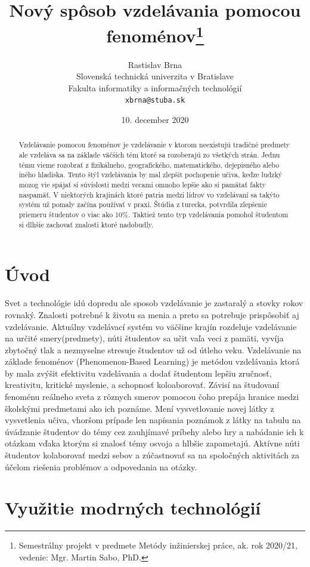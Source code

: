 \documentclass[11pt,slovak,a4paper]{article}
\title{Nový spôsob vzdelávania pomocou fenoménov\thanks{Semestrálny projekt v predmete Metódy inžinierskej práce, ak. rok 2020/21, vedenie: Mgr. Martin Sabo, PhD.}} %
\author{Rastislav Brna\\[2pt]
	{\small Slovenská technická univerzita v Bratislave}\\
	{\small Fakulta informatiky a informačných technológií}\\
	{\small \texttt{xbrna@stuba.sk}}
	}
\date{\small 10. december 2020}
\begin{document}
\maketitle

\begin{abstract}
	Vzdelávanie pomocou fenoménov je vzdelávanie v ktorom neexistujú 
	tradičné predmety ale vzdeláva sa na základe väčších tém ktoré sa rozoberajú zo všetkých strán.
	Jednu tému vieme rozobrať z fizikálneho, geografického, matematického, dejepisného alebo iného 
	hladiska. Tento štýl vzdelávania by mal zlepšit pochopenie učiva, keďze ludzký mozog vie spájať 
	si súvislosti medzi vecami omnoho lepšie ako si pamätať fakty naspamäť. V niektorých krajinách ktoré
	patria medzi lídrov vo vzdelávaní sa takýto systém už pomaly začína používať v praxi. Štúdia z turecka,
	potvrdila zlepšenie priemeru študentov o viac ako 10\%. Taktiež tento typ vzdelávania pomohol študentom 
	si dlhšie zachovať znalosťi ktoré nadobudly.\cite{jcer} 
\end{abstract}

\section{Úvod}

Svet a technológie idú dopredu ale sposob vzdelávanie je zastaralý a stovky rokov rovnaký. Znalosti potrebné k
životu sa menia a preto sa potrebuje prispôsobiť aj vzdelávanie. Aktuálny vzdelávací systém vo väčšine krajín 
rozdeluje vzdelávanie na určité smery(predmety), núti študentov sa učit vaľa veci z pamäti, vyvíja zbytočný tlak
a nezmyselne stresuje študentov už od útleho veku. Vzdelávanie na základe
fenoménov (Phenomenon-Based Learning) je metódou vzdelávania ktorá by mala zvýšit efektivitu vzdelávania
a dodať študentom lepšiu zručnosť, kreativitu, kritické myslenie, a schopnosť koloaborovať. Závisí na študovaní
fenoménu reálneho sveta z rôznych smerov pomocou čoho prepája hranice medzi školskými predmetami ako ich poznáme.
Mení vysvetlovanie novej látky z vysvetlenia učiva, vhoršom prípade len napísania poznámok z látky na tabulu na úvádzanie
študentov do témy cez zauhjímavé príbehy alebo hry a nabádanie ich k otázkam vďaka ktorým si znalosť témy osvoja a hlbšie zapametajú.
Aktívne núti študentov kolaborovať medzi sebov a zúčastnovať sa na spoločných aktivitách za účelom riešenia
problémov a odpovedania na otázky. 
\cite{pblf}

\section{Využitie modrných technológií}
\end{document}
